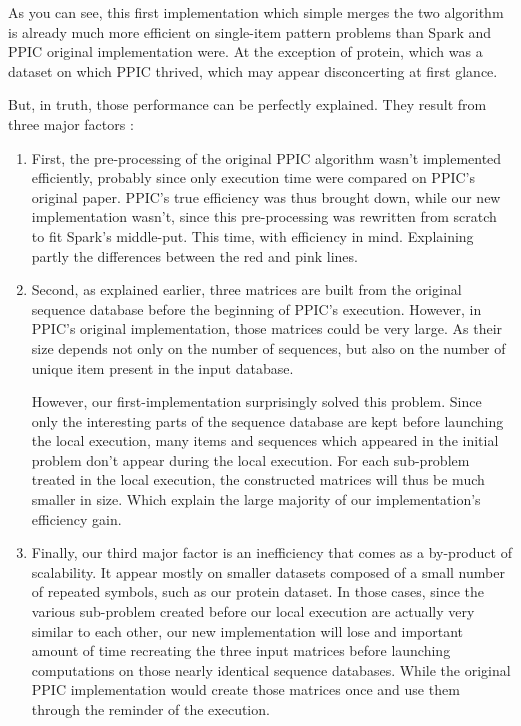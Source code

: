 \documentclass{eplmastersthesis}
\begin{document}
As you can see, this first implementation which simple merges the two algorithm is already much more efficient on single-item pattern problems than Spark and PPIC original implementation were. At the exception of protein, which was a dataset on which PPIC thrived, which may appear disconcerting at first glance. \newline

But, in truth, those performance can be perfectly explained. They result from three major factors :
\begin{enumerate}
\item First, the pre-processing of the original PPIC algorithm wasn't implemented efficiently, probably since only execution time were compared on PPIC's original paper. PPIC's true efficiency was thus brought down, while our new implementation wasn't, since this pre-processing was rewritten from scratch to fit Spark's middle-put. This time, with efficiency in mind. Explaining partly the differences between the red and pink lines.

\item Second, as explained earlier, three matrices are built from the original sequence database before the beginning of PPIC's execution. However, in PPIC's original implementation, those matrices could be very large. As their size depends not only on the number of sequences, but also on the number of unique item present in the input database. \newline
	
	However, our first-implementation surprisingly solved this problem. Since only the interesting parts of the sequence database are kept before launching the local execution, many items and sequences which appeared in the initial problem don't appear during the local execution. For each sub-problem treated in the local execution, the constructed matrices will thus be much smaller in size. Which explain the large majority of our implementation's efficiency gain.
	
\item Finally, our third major factor is an inefficiency that comes as a by-product of scalability. It appear mostly on smaller datasets composed of a small number of repeated symbols, such as our protein dataset. In those cases, since the various sub-problem created before our local execution are actually very similar to each other, our new implementation will lose and important amount of time recreating the three input matrices before launching computations on those nearly identical sequence databases. While the original PPIC implementation would create those matrices once and use them through the reminder of the execution. \newline


\end{enumerate}
\end{document}
